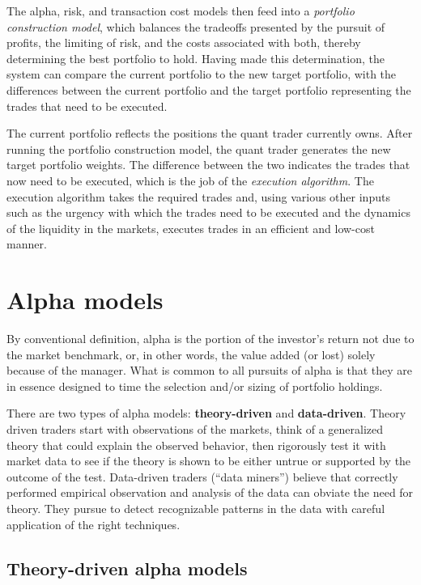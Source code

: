 \documentclass[11pt]{report}
\begin{document}
		The alpha, risk, and transaction cost models then feed into a \textit{portfolio construction model}, which balances the tradeoffs presented by the pursuit of profits, the limiting of risk, and the costs associated with both, thereby determining the best portfolio to hold. Having made this determination, the system can compare the current portfolio to the new target portfolio, with the differences between the current portfolio and the target portfolio representing the trades that need to be executed.

		The current portfolio reflects the positions the quant trader currently owns. After running the portfolio construction model, the quant trader generates the new target portfolio weights. The difference between the two indicates the trades that now need to be executed, which is the job of the \textit{execution algorithm}. The execution algorithm takes the required trades and, using various other inputs such as the urgency with which the trades need to be executed and the dynamics of the liquidity in the markets, executes trades in an efficient and low-cost manner.

	\chapter{Alpha models}

		By conventional definition, alpha is the portion of the investor's return not due to the market benchmark, or, in other words, the value added (or lost) solely because of the manager. What is common to all pursuits of alpha is that they are in essence designed to time the selection and/or sizing of portfolio holdings.

		There are two types of alpha models: \textbf{theory-driven} and \textbf{data-driven}. Theory driven traders start with observations of the markets, think of a generalized theory that could explain the observed behavior, then rigorously test it with market data to see if the theory is shown to be either untrue or supported by the outcome of the test. Data-driven traders (``data miners'') believe that correctly performed empirical observation and analysis of the data can obviate the need for theory. They pursue to detect recognizable patterns in the data with careful application of the right techniques.

		\section{Theory-driven alpha models}
\end{document}
